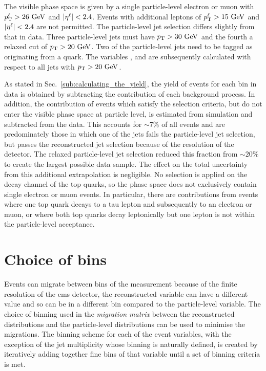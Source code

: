 The visible phase space is given by a single particle-level electron or muon with $p_{\mathrm{T}}^{\ell}>26\mathrm{~Ge\hspace{-.08em}V}^{}$ and $\lvert \eta^{\ell} \rvert<2.4$.
Events with additional leptons of $p_{\mathrm{T}}^{\ell}>15\mathrm{~Ge\hspace{-.08em}V}^{}$ and $\lvert \eta^{\ell} \rvert<2.4$ are not permitted.
The particle-level jet selection differs slightly from that in data.
Three particle-level jets must have $p_{\mathrm{T}}>30\mathrm{~Ge\hspace{-.08em}V}^{}$ and the fourth a relaxed cut of $p_{\mathrm{T}}>20\mathrm{~Ge\hspace{-.08em}V}^{}$.
Two of the particle-level jets need to be tagged as originating from a \bquark{} quark.
The variables \HT{}, \ST{} and \NJET{} are subsequently calculated with respect to all jets with $p_{\mathrm{T}}>20\mathrm{~Ge\hspace{-.08em}V}^{}$. 

As stated in Sec.~\ref{sub:calculating_the_yield}, the yield of \ttbar{} events for each bin in data is obtained by subtracting the contribution of each background process. In addition, the contribution of \ttbar events which satisfy the selection criteria, but do not enter the visible phase space at particle level, is estimated from simulation and subtracted from the data. 
This accounts for $\sim7\%$ of all \ttbar{} events and are predominately those
in which one of the jets fails the particle-level jet selection, but passes the reconstructed jet selection because of the resolution of the detector. 
The relaxed particle-level jet selection reduced this fraction from $\sim20\%$ to create the largest possible data sample.
The effect on the total uncertainty from this additional extrapolation is negligible.
No selection is applied on the decay channel of the top quarks, so the phase space does not exclusively contain single electron or muon \ttbar{} events. 
In particular, there are contributions from events where one top quark decays to a tau lepton and subsequently to an electron or muon, or where both top quarks decay leptonically but one lepton is not within the particle-level acceptance.

\section{Choice of bins} %
\label{sec:choice_of_bins}

Events can migrate between bins of the measurement because of the finite resolution of the \acrshort{cms} detector, \ie{} the reconstructed variable can have a different value and so can be in a different bin compared to the particle-level variable.  
The choice of binning used in the \textit{migration matrix} between the reconstructed distributions and the particle-level distributions can be used to minimise the migrations.
The binning scheme for each of the event variables, with the exception of the jet multiplicity whose binning is naturally defined, is created by iteratively adding together fine bins of that variable until a set of binning criteria is met.

